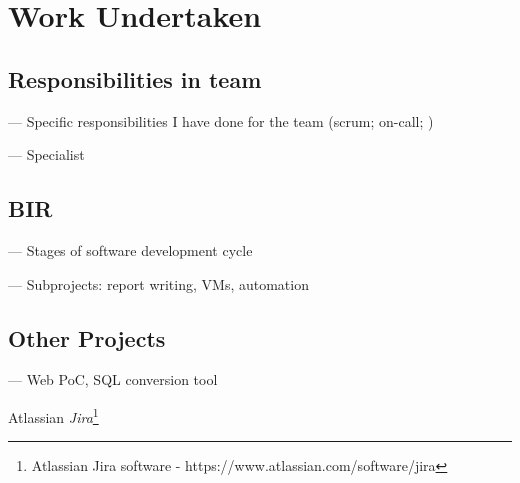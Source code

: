\chapter{Work Undertaken}

\section{Responsibilities in team}

--- Specific responsibilities I have done for the team (scrum; on-call; )

--- Specialist

\section{BIR}

--- Stages of software development cycle

--- Subprojects: report writing, VMs, automation

\section{Other Projects}

--- Web PoC, SQL conversion tool

\begin{comment}
lorem ipsum blah blah blah
\end{comment}

Atlassian \textit{Jira}\footnote{Atlassian Jira software - https://www.atlassian.com/software/jira}
